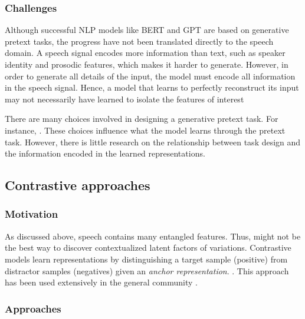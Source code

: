 \subsubsection{Challenges} 

Although successful NLP models like BERT and GPT are based on generative pretext tasks, the progress have not been translated directly to the speech domain. A speech signal encodes more information than text, such as speaker identity and prosodic features, which makes it harder to generate. However, in order to generate all details of the input, the model must encode all information in the speech signal. Hence, a model that learns to perfectly reconstruct its input may not necessarily have learned to isolate the features of interest  

There are many choices involved in designing a generative pretext task. For instance, . These choices influence what the model learns through the pretext task. However, there is little research on the relationship between task design and the information encoded in the learned representations.






\subsection{Contrastive approaches}
\label{contrastive_approaches}
\subsubsection{Motivation}
As discussed above, speech contains many entangled features. Thus,  might not be the best way to discover contextualized latent factors of variations. 
Contrastive models learn representations by distinguishing a target sample (positive) from distractor samples (negatives) given an \emph{anchor representation}. . This approach has been used extensively in the general  community \cite{schultz_learning_2003}.

\subsubsection{Approaches}
